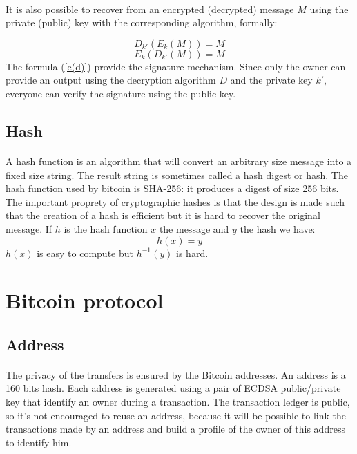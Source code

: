 \documentclass[letterpaper]{article}
\begin{document}
\paragraph{}
It is also possible to recover from an encrypted
(decrypted) message $M$ using the private (public) key with the
corresponding algorithm, formally:

\begin{equation}
    D_{k'}(E_k(M)) = M
\end{equation}
\begin{equation}
    \label{e(d)}
    E_{k}(D_{k'}(M)) = M
\end{equation}
The formula (\ref{e(d)}) provide the signature mechanism. Since only
the owner can provide an output using the decryption algorithm $D$ and
the private key $k'$, everyone can verify the signature using the public key.


\subsection{Hash}

\paragraph{}
A hash function is an algorithm that will convert an arbitrary
size message into a fixed size string. The result string
is sometimes called a hash digest or hash. The hash function
used by bitcoin is SHA-256: it produces a digest of size 256 bits.
The important proprety of cryptographic hashes is that the design is made
such that the creation of a hash is efficient but it is hard to recover the
original message. If $h$ is the hash function $x$ the message and $y$ the hash
we have:
\begin{equation}
    h(x) = y
\end{equation}
$h(x)$ is easy to compute but $h^{-1}(y)$ is hard.

\section{Bitcoin protocol}

\subsection{Address}
\paragraph{}
The privacy of the transfers is ensured by the Bitcoin addresses. An address
is a 160 bits hash. Each address
is generated using a pair of ECDSA\cite{ecdsawiki} public/private key
that identify an owner
during a transaction. The transaction ledger is public, so it's not encouraged
to reuse an address, because it will be possible to link the transactions
made by an address and build a profile of the owner of this address to identify
him.
\end{document}
